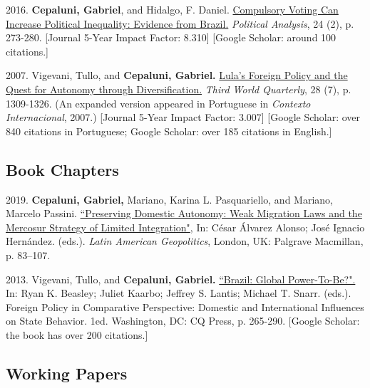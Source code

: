 \documentclass[a4paper,11.5pt]{article}
\renewenvironment{itemize}{
	\begin{list}{}{
			\setlength{\leftmargin}{1.5em}
		}
		}{
	\end{list}
}
\begin{document}
\begin{itemize}
	\item 2016. \textbf{Cepaluni, Gabriel}, and Hidalgo, F. Daniel. \href{https://www.cambridge.org/core/journals/political-analysis/article/abs/compulsory-voting-can-increase-political-inequality-evidence-from-brazil/76BB8B11EA9A3FF75A1B0591C663B303}{Compulsory Voting Can Increase Political Inequality: Evidence from Brazil.} \textit{Political Analysis}, 24 (2), p. 273-280.  [Journal 5-Year Impact Factor: 8.310] [Google Scholar: around 100 citations.]
	
	\item 2007. Vigevani, Tullo, and \textbf{Cepaluni, Gabriel.} \href{https://tinyurl.com/y5wk2js5}{Lula's Foreign Policy and the Quest for Autonomy through Diversification.}  \textit{Third World Quarterly}, 28 (7), p. 1309-1326. (An expanded version appeared in Portuguese in \emph{Contexto Internacional}, 2007.)
	[Journal 5-Year Impact Factor: 3.007] [Google Scholar: over 840 citations in Portuguese; Google Scholar: over 185 citations in English.]
\end{itemize}

\subsection*{Book Chapters}

\begin{itemize}
	\item 2019. \textbf{Cepaluni, Gabriel,} Mariano, Karina L. Pasquariello, and Mariano, Marcelo Passini.  \href{https://link.springer.com/chapter/10.1007/978-3-319-99552-6_4}{``Preserving Domestic Autonomy: Weak Migration Laws and the Mercosur Strategy of Limited Integration"}, In: César Álvarez Alonso; José Ignacio Hernández. (eds.). \textit{Latin American Geopolitics}, London, UK: Palgrave Macmillan, p. 83--107.
	
	\item 2013. Vigevani, Tullo, and \textbf{Cepaluni, Gabriel.} \href{https://tinyurl.com/4k8c5d2m}{``Brazil: Global Power-To-Be?".} In: Ryan K. Beasley; Juliet Kaarbo; Jeffrey S. Lantis; Michael T. Snarr. (eds.). Foreign Policy in Comparative Perspective: Domestic and International Influences on State Behavior. 1ed. Washington, DC: CQ Press, p. 265-290. [Google Scholar: the book has over 200 citations.]
\end{itemize}

\subsection*{Working Papers}
\end{document}
